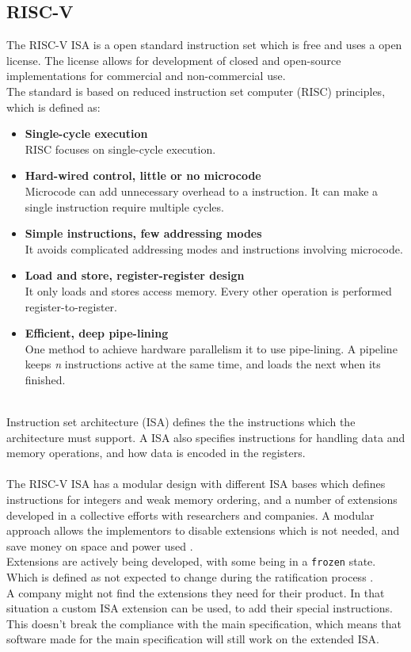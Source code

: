 \subsection{RISC-V}
The RISC-V ISA is a open standard instruction set which is free and uses a open license. The license allows for development of closed and open-source implementations for commercial and non-commercial use.\\
The standard is based on reduced instruction set computer (RISC) principles, which is defined as:
\begin{itemize}
    \item \textbf{Single-cycle execution}\\RISC focuses on single-cycle execution.
    \item \textbf{Hard-wired control, little or no microcode}\\Microcode can add unnecessary overhead to a instruction. It can make a single instruction require multiple cycles.
    \item \textbf{Simple instructions, few addressing modes}\\It avoids complicated addressing modes and instructions involving microcode. 
    \item \textbf{Load and store, register-register design}\\It only loads and stores access memory. Every other operation is performed register-to-register.
    \item \textbf{Efficient, deep pipe-lining}\\One method to achieve hardware parallelism it to use pipe-lining. A pipeline keeps \textit{n} instructions active at the same time, and loads the next when its finished.
\end{itemize}
\\
Instruction set architecture (ISA) defines the the instructions which the architecture must support. A ISA also specifies instructions for handling data and memory operations, and how data is encoded in the registers.\\
\\
The RISC-V ISA has a modular design with different ISA bases which defines instructions for integers and weak memory ordering, and a number of extensions developed in a collective efforts with researchers and companies.
A modular approach allows the implementors to disable extensions which is not needed, and save money on space and power used \cite{extendrisc}. \\
Extensions are actively being developed, with some being in a \texttt{frozen} state. Which is defined as not expected to change during the ratification process \cite{riscmanual}.
\pagebreak
\\
A company might not find the extensions they need for their product. In that situation a custom ISA extension can be used, to add their special instructions. 
This doesn't break the compliance with the main specification, which means that software made for the main specification will still work on the extended ISA.

